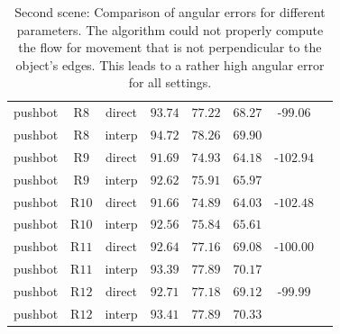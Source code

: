 \begin{appendix}
\begin{table}[tb]
\begin{tabular}{lccccccc}
pushbot & R$8$ & direct & $93.74$ & $77.22$ & $68.27$ & -$99.06$ & \\
pushbot & R$8$ & interp & $94.72$ & $78.26$ & $69.90$ &  & \\
pushbot & R$9$ & direct & $91.69$ & $74.93$ & $64.18$ & -$102.94$ & \\
pushbot & R$9$ & interp & $92.62$ & $75.91$ & $65.97$ &  & \\
pushbot & R$10$ & direct & $91.66$ & $74.89$ & $64.03$ & -$102.48$ & \\
pushbot & R$10$ & interp & $92.56$ & $75.84$ & $65.61$ &  & \\
pushbot & R$11$ & direct & $92.64$ & $77.16$ & $69.08$ & -$100.00$ & \\
pushbot & R$11$ & interp & $93.39$ & $77.89$ & $70.17$ &  & \\
pushbot & R$12$ & direct & $92.71$ & $77.18$ & $69.12$ & -$99.99$ & \\
pushbot & R$12$ & interp & $93.41$ & $77.89$ & $70.33$ &  & \\
		\end{tabular}
	\caption[Second scene: Comparison of angular errors for different parameters.]{Second scene: Comparison of angular errors for different parameters. The algorithm could not properly compute the flow for movement that is not perpendicular to the object's edges. This leads to a rather high angular error for all settings.}
	\label{tab:app_error_comparison_pushbot}
\end{table}



\end{appendix}
